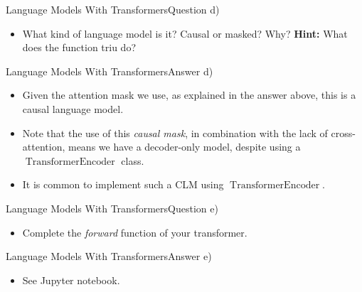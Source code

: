 \documentclass[t]{beamer}
\newcommand\op[1]{\operatorname{#1}}
\begin{document}
\begin{frame}{Language Models With Transformers}{Question d)}
    \begin{itemize}
        \item What kind of language model is it? Causal or masked? Why?
              \textbf{Hint:} What does the function triu do?
    \end{itemize}
\end{frame}

\begin{frame}{Language Models With Transformers}{Answer d)}
    \begin{itemize}
        \item Given the attention mask we use, as explained in the answer above,
              this is a causal language model.
        \item Note that the use of this \emph{causal mask}, in combination with
              the lack of cross-attention, means we have a decoder-only model,
              despite using a $\op{TransformerEncoder}$ class.
        \item It is common to implement such a CLM using
              $\op{TransformerEncoder}$.
    \end{itemize}
\end{frame}

\begin{frame}{Language Models With Transformers}{Question e)}
    \begin{itemize}
        \item Complete the \emph{forward} function of your transformer.
    \end{itemize}
\end{frame}

\begin{frame}{Language Models With Transformers}{Answer e)}
    \begin{itemize}
        \item See Jupyter notebook.
    \end{itemize}
\end{frame}
\end{document}
